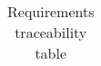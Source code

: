 \begin{center}
\begin{longtable}{|p{}|p{}|>{\raggedright\arraybackslash}p{}|>{\raggedright\arraybackslash}p{}|}
\caption{Requirements traceability table} 
\label{tab:reqTraceTable}
\end{longtable} 
\end{center}